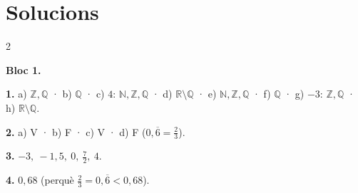 \documentclass[13pt,a4paper]{extarticle}
\begin{document}
\section*{Solucions}
\small\begin{multicols}{2}

\textbf{Bloc 1.}\par
\par\noindent\begin{minipage}{\linewidth}
\textbf{1.} a) $\mathbb{Z},\mathbb{Q}$ · b) $\mathbb{Q}$ · c) $4$: $\mathbb{N},\mathbb{Z},\mathbb{Q}$ · d) $\mathbb{R}\setminus\mathbb{Q}$ · e) $\mathbb{N},\mathbb{Z},\mathbb{Q}$ · f) $\mathbb{Q}$ · g) $-3$: $\mathbb{Z},\mathbb{Q}$ · h) $\mathbb{R}\setminus\mathbb{Q}$.\par
\end{minipage}\par\vspace{1.6mm}
\par\noindent\begin{minipage}{\linewidth}
\textbf{2.} a) V · b) F · c) V · d) F ($0{,}\overline6=\tfrac23$).\par
\end{minipage}\par\vspace{1.6mm}
\par\noindent\begin{minipage}{\linewidth}
\textbf{3.} $-3,\ -1{,}5,\ 0,\ \tfrac72,\ 4$.\par
\end{minipage}\par\vspace{1.6mm}
\par\noindent\begin{minipage}{\linewidth}
\textbf{4.} $0{,}68$ (perquè $\tfrac23=0{,}\overline6<0{,}68$).\par


\end{minipage}
\end{multicols}
\end{document}
